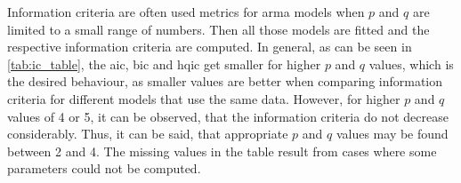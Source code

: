 Information criteria are often used metrics for \gls{arma} models when $p$ and $q$ are limited to a small range of numbers. Then all those models are fitted and the respective information criteria are computed. In general, as can be seen in \cref{tab:ic_table}, the \gls{aic}, \gls{bic} and \gls{hqic} get smaller for higher $p$ and $q$ values, which is the desired behaviour, as smaller values are better when comparing information criteria for different models that use the same data. However, for higher $p$ and $q$ values of 4 or 5, it can be observed, that the information criteria do not decrease considerably. Thus, it can be said, that appropriate $p$ and $q$ values may be found between 2 and 4. The missing values in the table result from cases where some parameters could not be computed.\\

